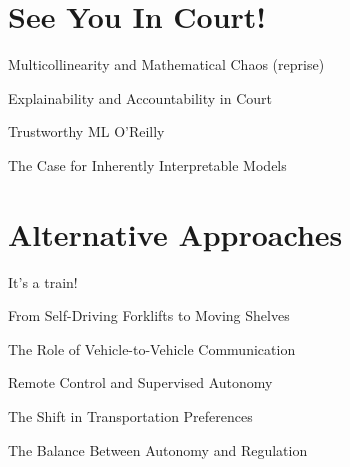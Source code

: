 \section{See You In Court!}

Multicollinearity and Mathematical Chaos (reprise)

Explainability and Accountability in Court

Trustworthy ML O'Reilly \cite{trustworthyml}

The Case for Inherently Interpretable Models

\section{Alternative Approaches}

It's a train!

From Self-Driving Forklifts to Moving Shelves

The Role of Vehicle-to-Vehicle Communication

Remote Control and Supervised Autonomy

The Shift in Transportation Preferences

The Balance Between Autonomy and Regulation
